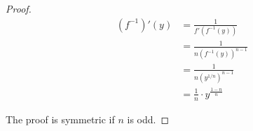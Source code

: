 \documentclass[../main.tex]{subfiles}
\begin{document}
\begin{exercise}
\begin{proof}
        \begin{align*}
            (f^{-1})'(y) &= \frac{1}{f'(f^{-1}(y))}\\
            &= \frac{1}{n(f^{-1}(y))^{n-1}}\\
            &= \frac{1}{n(y^{1/n})^{n-1}}\\
            &= \frac{1}{n}\cdot y^{\frac{1-n}{n}}
        \end{align*}\par\smallskip
        The proof is symmetric if $n$ is odd.
    \end{proof}
\end{exercise}
\end{document}
